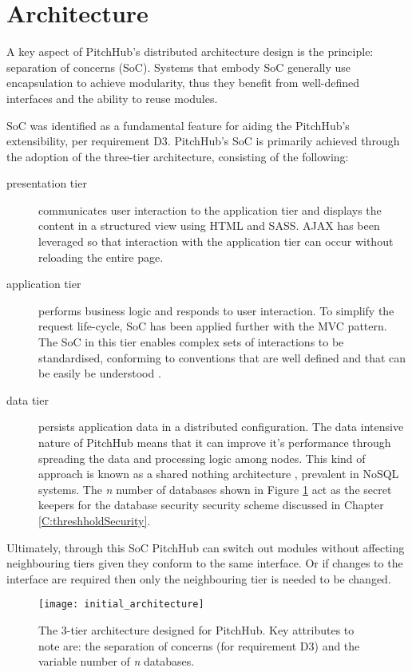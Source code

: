 \section{Architecture}

A key aspect of PitchHub's distributed architecture design is the principle: separation of concerns (SoC). Systems that embody SoC generally use encapsulation to achieve modularity, thus they benefit from well-defined interfaces and the ability to reuse modules.

SoC was identified as a fundamental feature for aiding the PitchHub's extensibility, per requirement D3.  PitchHub's SoC is primarily achieved through the adoption of the three-tier architecture, consisting of the following: 

\begin{description}
  \item[presentation tier] communicates user interaction to the application tier and displays the content in a structured view using HTML and SASS. AJAX has been leveraged so that interaction with the application tier can occur without reloading the entire page.
  \item[application tier] performs business logic and responds to user interaction. To simplify the request life-cycle, SoC has been applied further with the MVC pattern. The SoC in this tier enables complex sets of interactions to be standardised, conforming to conventions that are well defined and that can be easily be understood \cite{leff2001web}.
  \item[data tier] persists application data in a distributed configuration. The data intensive nature of PitchHub means that it can improve it's performance through spreading the data and processing logic among nodes. This kind of approach is known as a shared nothing architecture \cite{stonebraker1986case}, prevalent in NoSQL systems. The \textit{n} number of databases shown in Figure \ref{fig:architecture_1} act as the secret keepers for the database security security scheme discussed in Chapter \ref{C:threshholdSecurity}.
\end{description}

Ultimately, through this SoC PitchHub can switch out modules without affecting neighbouring tiers given they conform to the same interface. Or if changes to the interface are required then only the neighbouring tier is needed to be changed. 

\begin{figure}[ht]
    \centering
    \texttt{[image: initial\_architecture]}
    \caption{The 3-tier architecture designed for PitchHub. Key attributes to note are: the separation of concerns (for requirement D3) and the variable number of \textit{n} databases.}
    \label{fig:architecture_1}
\end{figure}

